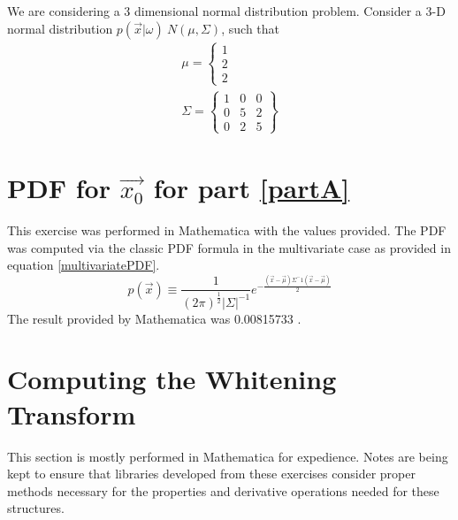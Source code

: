 \documentclass[11pt]{article}
\begin{document}
We are considering a 3 dimensional normal distribution problem.  Consider a 3-D normal distribution $p(\vec{x} | \omega) ~ N(\mu , \Sigma)$, such that 
\begin{eqnarray}
	\mu = 
	\left\{
	\begin{array}{l}
		1 \\
		2 \\
		2 
	\end{array}
	\right.
\\
\Sigma = 
\left\{
\begin{array}{lll}
	1 & 0 & 0 \\
	0 & 5 & 2 \\
	0 & 2 & 5 
\end{array}
\right\}
\end{eqnarray}


\section{PDF for $\vec{x_0}$ for part \ref{partA}}
This exercise was performed in Mathematica \cite{wolframResearch} with the values provided.   The PDF was computed via the classic PDF formula in the multivariate case as provided in equation \ref{multivariatePDF}.
\begin{equation}
	p(\vec{x}) \equiv \frac{1}{(2\pi)^{\frac{1}{2}}  |\Sigma|^{-1}} e^ {- \frac{(\vec{x} - \vec{\mu})  \Sigma^-1 (\vec{x} - \vec{\mu})}{2}} \label{multivariatePDF}
\end{equation}
The result provided by Mathematica was 0.00815733 .  

\section{Computing the Whitening Transform}
This section is mostly performed in Mathematica for expedience.  Notes are being kept to ensure that libraries developed from these exercises consider proper methods necessary for the properties and derivative operations needed for these structures.  
\end{document}
